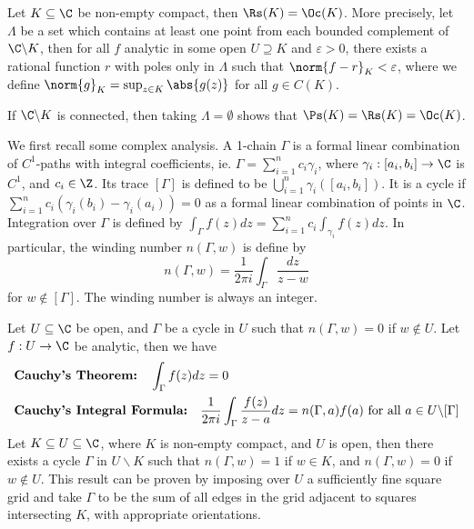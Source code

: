 \documentclass[a4paper]{article}
\begin{document}
\begin{nthm}\label{thm:Runge}
  Let $K\subseteq\C$ be non-empty compact, then $\Rs(K)=\Oc(K)$. More precisely, let $\Lambda$ be a set which contains at least one point from each bounded complement of $\C\backslash K$, then for all $f$ analytic in some open $U\supseteq K$ and $\varepsilon>0$, there exists a rational function $r$ with poles only in $\Lambda$ such that $\norm{f-r}_K<\varepsilon$, where we define $\norm{g}_K=\sup_{z\in K}\abs{g(z)}$ for all $g\in C(K)$.
\end{nthm}

\begin{remark}
  If $\C\backslash K$ is connected, then taking $\Lambda=\emptyset$ shows that $\Ps(K)=\Rs(K)=\Oc(K)$.
\end{remark}

We first recall some complex analysis. A 1-chain $\Gamma$ is a formal linear combination of $C^1$-paths with integral coefficients, ie. $\Gamma=\sum_{i=1}^n c_i\gamma_i$, where $\gamma_i:[a_i,b_i]\to\C$ is $C^1$, and $c_i\in\Z$. Its trace $[\Gamma]$ is defined to be $\bigcup_{i=1}^n\gamma_i([a_i,b_i])$. It is a cycle if $\sum_{i=1}^n c_i(\gamma_i(b_i)-\gamma_i(a_i))=0$ as a formal linear combination of points in $\C$. Integration over $\Gamma$ is defined by $\int_\Gamma f(z)dz=\sum_{i=1}^n c_i\int_{\gamma_i}f(z)dz$. In particular, the winding number $n(\Gamma,w)$ is define by
\[n(\Gamma,w)=\frac{1}{2\pi i}\int_\Gamma\frac{dz}{z-w}\]
for $w\notin[\Gamma]$. The winding number is always an integer.

Let $U\subseteq\C$ be open, and $\Gamma$ be a cycle in $U$ such that $n(\Gamma,w)=0$ if $w\notin U$. Let $f:U\to\C$ be analytic, then we have
\begin{align*}
	& \text{\bfseries Cauchy's Theorem:}\quad \int_\Gamma f(z)dz=0\\
	& \text{\bfseries Cauchy's Integral Formula:}\quad\frac{1}{2\pi i}\int_\Gamma\frac{f(z)}{z-a}dz=n(\Gamma,a)f(a)\text{ for all }a\in U\backslash[\Gamma]
\end{align*}
Let $K\subseteq U\subseteq\C$, where $K$ is non-empty compact, and $U$ is open, then there exists a cycle $\Gamma$ in $U\backslash K$ such that $n(\Gamma,w)=1$ if $w\in K$, and $n(\Gamma,w)=0$ if $w\notin U$. This result can be proven by imposing over $U$ a sufficiently fine square grid and take $\Gamma$ to be the sum of all edges in the grid adjacent to squares intersecting $K$, with appropriate orientations.
\end{document}
